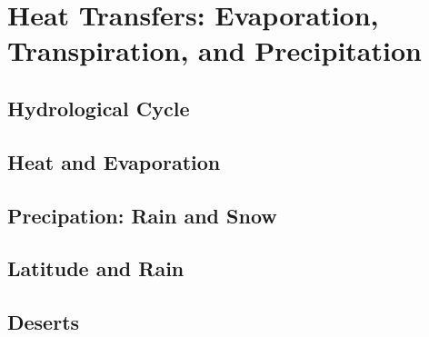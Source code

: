 \chapter{Heat Transfers: Evaporation, Transpiration, and Precipitation}

\section{Hydrological Cycle}

\section{Heat and Evaporation}

\section{Precipation: Rain and Snow}

\section{Latitude and Rain}

\section{Deserts}

